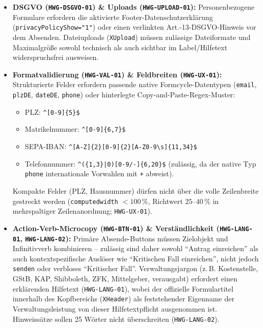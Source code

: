 \begin{itemize}
    \item \textbf{DSGVO (\texttt{HWG-DSGVO-01}) \& Uploads (\texttt{HWG-UPLOAD-01}):} Personenbezogene Formulare erfordern die aktivierte Foo\-ter-Da\-ten\-schutz\-er\-klä\-rung (\texttt{privacyPolicy\allowbreak Show="1"}) oder einen verlinkten Art.-13-DSGVO-Hinweis vor dem Absenden. Dateiuploads (\texttt{XUpload}) müssen zulässige Dateiformate und Maximalgröße sowohl technisch als auch sichtbar im Label/Hilfetext widerspruchsfrei ausweisen.
    \item \textbf{Formatvalidierung (\texttt{HWG-VAL-01}) \& Feldbreiten (\texttt{HWG-UX-01}):} Strukturierte Felder erfordern passende native Formcycle-Datentypen (\texttt{email}, \texttt{plzDE}, \texttt{dateDE}, \texttt{phone}) oder hinterlegte Copy-and-Paste-Regex-Muster:
    \begin{itemize}
        \item PLZ: \texttt{\^{}[0-9]\{5\}\$}
        \item Matrikelnummer: \texttt{\^{}[0-9]\{6,7\}\$}
        \item SEPA-IBAN: \texttt{\^{}[A-Z]\{2\}[0-9]\{2\}[A-Z0-9\textbackslash s]\{11,34\}\$}
        \item Telefonnummer: \texttt{\string^(\string\+[0-9]\{1,3\}|0)[0-9\string\s/-]\{6,20\}\$} (zulässig, da der native Typ \texttt{phone} internationale Vorwahlen mit \texttt{+} abweist).
    \end{itemize}
    Kompakte Felder (PLZ, Hausnummer) dürfen nicht über die volle Zeilenbreite gestreckt werden (\texttt{computedwidth} $< 100\,\%$, Richtwert $25\text{--}40\,\%$ in mehrspaltiger Zeilenanordnung; \texttt{HWG-UX-01}).
    \item \textbf{Action-Verb-Microcopy (\texttt{HWG-BTN-01}) \& Verständlichkeit (\texttt{HWG-LANG-01}, \texttt{HWG-LANG-02}):} Primäre Absende-Buttons müssen Zielobjekt und Infinitivverb kombinieren – zulässig sind daher sowohl \enquote{Antrag einreichen} als auch kontextspezifische Auslöser wie \enquote{Kritischen Fall einreichen}, nicht jedoch \texttt{senden} oder verbloses \enquote{Kritischer Fall}. Verwaltungsjargon (z.\,B. Kostenstelle, GStB, KAP, Shibboleth, ZFK, Mittelgeber, verausgabt) erfordert einen erklärenden Hilfetext (\texttt{HWG-LANG-01}), wobei der offizielle Formulartitel innerhalb des Kopfbereichs (\texttt{XHeader}) als feststehender Eigenname der Verwaltungsleistung von dieser Hilfetextpflicht ausgenommen ist. Hinweissätze sollen 25 Wörter nicht überschreiten (\texttt{HWG-LANG-02}).
\end{itemize}

